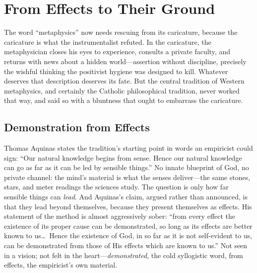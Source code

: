 \section{From Effects to Their Ground}

The word ``metaphysics'' now needs rescuing from its caricature, because the caricature is what the instrumentalist refuted. In the caricature, the metaphysician closes his eyes to experience, consults a private faculty, and returns with news about a hidden world---assertion without discipline, precisely the wishful thinking the positivist hygiene was designed to kill. Whatever deserves that description deserves its fate. But the central tradition of Western metaphysics, and certainly the Catholic philosophical tradition, never worked that way, and said so with a bluntness that ought to embarrass the caricature.

\subsection{Demonstration from Effects}

Thomas Aquinas states the tradition's starting point in words an empiricist could sign: ``Our natural knowledge begins from sense. Hence our natural knowledge can go as far as it can be led by sensible things.'' No innate blueprint of God, no private channel: the mind's material is what the senses deliver---the same stones, stars, and meter readings the sciences study. The question is only how far sensible things can \emph{lead}. And Aquinas's claim, argued rather than announced, is that they lead beyond themselves, because they present themselves as effects. His statement of the method is almost aggressively sober: ``from every effect the existence of its proper cause can be demonstrated, so long as its effects are better known to us\ldots\ Hence the existence of God, in so far as it is not self-evident to us, can be demonstrated from those of His effects which are known to us.'' Not seen in a vision; not felt in the heart---\emph{demonstrated}, the cold syllogistic word, from effects, the empiricist's own material.

